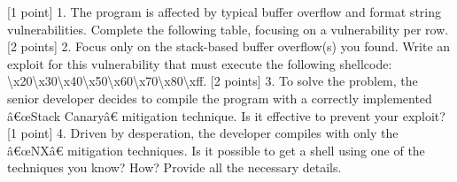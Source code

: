 \documentclass{article}
\begin{document}
[1 point] 1. The program is affected by typical buffer overflow and format string vulnerabilities. Complete the following table, focusing on a vulnerability per row.
[2 points] 2. Focus only on the stack-based buffer overflow(s) you found. Write an exploit for this vulnerability that must execute the following shellcode: \textbackslash{}x20\textbackslash{}x30\textbackslash{}x40\textbackslash{}x50\textbackslash{}x60\textbackslash{}x70\textbackslash{}x80\textbackslash{}xff.
[2 points] 3. To solve the problem, the senior developer decides to compile the program with a correctly implemented â€œStack Canaryâ€ mitigation technique. Is it effective to prevent your exploit?
[1 point] 4. Driven by desperation, the developer compiles with only the â€œNXâ€ mitigation techniques. Is it possible to get a shell using one of the techniques you know? How? Provide all the necessary details.
\end{document}
